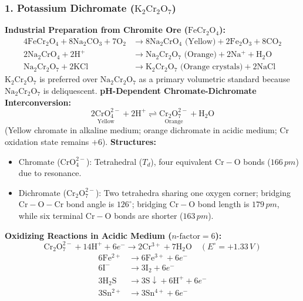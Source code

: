 \documentclass[10pt,twoside,openright]{book}
\begin{document}
\subsubsection{1. Potassium Dichromate ($\mathrm{K_2Cr_2O_7}$)}
\textbf{Industrial Preparation from Chromite Ore ($\mathrm{FeCr_2O_4}$):}
\begin{align}
  4\mathrm{FeCr_2O_4} + 8\mathrm{Na_2CO_3} + 7\mathrm{O_2} &\longrightarrow 8\mathrm{Na_2CrO_4\text{ (Yellow)}} + 2\mathrm{Fe_2O_3} + 8\mathrm{CO_2} \\
  2\mathrm{Na_2CrO_4} + 2\mathrm{H^+} &\longrightarrow \mathrm{Na_2Cr_2O_7\text{ (Orange)}} + 2\mathrm{Na^+} + \mathrm{H_2O} \\
  \mathrm{Na_2Cr_2O_7} + 2\mathrm{KCl} &\longrightarrow \mathbf{\mathrm{K_2Cr_2O_7\text{ (Orange crystals)}}} + 2\mathrm{NaCl}
\end{align}
$\mathrm{K_2Cr_2O_7}$ is preferred over $\mathrm{Na_2Cr_2O_7}$ as a primary volumetric standard because $\mathrm{Na_2Cr_2O_7}$ is deliquescent.
\textbf{pH-Dependent Chromate-Dichromate Interconversion:}
\begin{equation}
  \underset{\text{Yellow}}{\mathrm{2CrO_4^{2-}}} + 2\mathrm{H^+} \rightleftharpoons \underset{\text{Orange}}{\mathrm{Cr_2O_7^{2-}}} + \mathrm{H_2O}
\end{equation}
(Yellow chromate in alkaline medium; orange dichromate in acidic medium; Cr oxidation state remains $+6$).
\textbf{Structures:}
\begin{itemize}
  \item Chromate ($\mathrm{CrO_4^{2-}}$): Tetrahedral ($T_d$), four equivalent $\mathrm{Cr-O}$ bonds ($166\,\si{pm}$) due to resonance.
  \item Dichromate ($\mathrm{Cr_2O_7^{2-}}$): Two tetrahedra sharing one oxygen corner; bridging $\mathrm{Cr-O-Cr}$ bond angle is \textbf{$126^\circ$}; bridging $\mathrm{Cr-O}$ bond length is $179\,\si{pm}$, while six terminal $\mathrm{Cr-O}$ bonds are shorter ($163\,\si{pm}$).
\end{itemize}
\textbf{Oxidizing Reactions in Acidic Medium ($n\text{-factor} = 6$):}
\begin{equation}
  \mathrm{Cr_2O_7^{2-}} + 14\mathrm{H^+} + 6e^- \longrightarrow 2\mathrm{Cr^{3+}} + 7\mathrm{H_2O} \quad (E^\circ = +1.33\,\si{V})
\end{equation}
\begin{align}
  6\mathrm{Fe^{2+}} &\longrightarrow 6\mathrm{Fe^{3+}} + 6e^- \\
  6\mathrm{I^-} &\longrightarrow 3\mathrm{I_2} + 6e^- \\
  3\mathrm{H_2S} &\longrightarrow 3\mathrm{S\downarrow} + 6\mathrm{H^+} + 6e^- \\
  3\mathrm{Sn^{2+}} &\longrightarrow 3\mathrm{Sn^{4+}} + 6e^-
\end{align}
\end{document}
